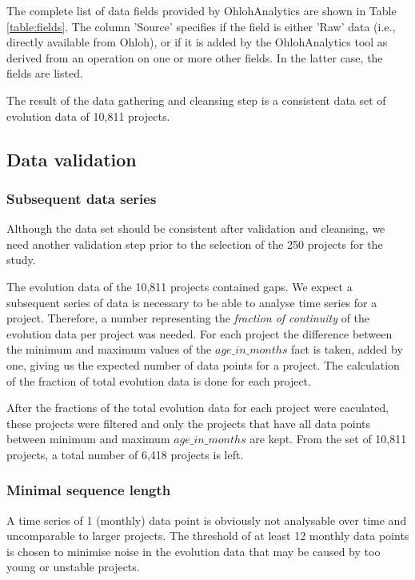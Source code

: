 The complete list of data fields provided by OhlohAnalytics are shown in Table
\ref{table:fields}. The column 'Source' specifies if the field is either 'Raw'
data (i.e., directly available from Ohloh), or if it is added by the
OhlohAnalytics tool as derived from an operation on one or more other fields.
In the latter case, the fields are listed.

The result of the data gathering and cleansing step is a consistent data set of
evolution data of 10,811 projects.



\subsection{Data validation}
\subsubsection{Subsequent data series}
Although the data set should be consistent after validation and cleansing, we 
need another validation step prior to the selection of the 250 projects for the
study.

The evolution data of the 10,811 projects contained gaps. We expect a
subsequent series of data is necessary to be able to analyse time series for a
project. Therefore, a number representing the \emph{fraction of continuity }\rm
of the evolution data per project was needed. For each project the difference
between the minimum and maximum values of the $age\_in\_months$ fact is taken,
added by one, giving us the expected number of data points for a project. The
calculation of the fraction of total evolution data is done for each project.

After the fractions of the total evolution data for each project were caculated,
these projects were filtered and only the projects that have all data points
between minimum and maximum $age\_in\_months$ are kept. From the set of 10,811
projects, a total number of 6,418 projects is left.

\subsubsection{Minimal sequence length}
A time series of 1 (monthly) data point is obviously not analysable over time
and uncomparable to larger projects. The threshold of at least 12 monthly data
points is chosen to minimise noise in the evolution data that may be caused by
too young or unstable projects.

